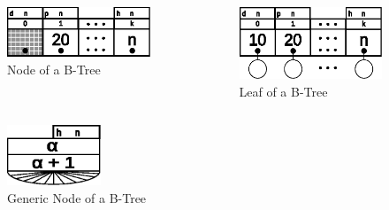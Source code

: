 \begin{frame}
    \framebreak{}
    \begin{columns}
        \begin{column}{0.35\textwidth}
                \begin{figure}
                    \includegraphics[width=\textwidth]{resources/made/single_node.eps}
                    \caption[]{Node of a B-Tree}
                \end{figure}
        \end{column}
        \begin{column}{0.35\textwidth}
                \begin{figure}
                    \includegraphics[width=\textwidth]{resources/made/single_leaf.eps}
                    \caption[]{Leaf of a B-Tree}
                \end{figure}
        \end{column}
    \end{columns}
    \begin{figure}
        \includegraphics[width=0.25\textwidth]{resources/made/single_node_generic.eps}
        \caption[]{Generic Node of a B-Tree}
    \end{figure}
\end{frame}
